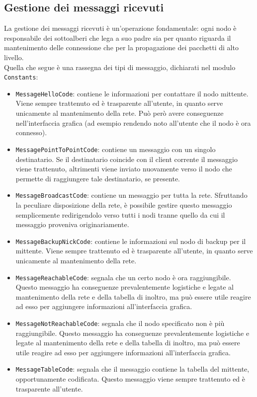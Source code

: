 \documentclass[10pt]{article} %
\begin{document}
\subsection{Gestione dei messaggi ricevuti}
La gestione dei messaggi ricevuti è un'operazione fondamentale: ogni nodo è responsabile dei sottoalberi che lega a suo padre sia per quanto riguarda il mantenimento delle connessione che per la propagazione dei pacchetti di alto livello. \\
Quella che segue è una rassegna dei tipi di messaggio, dichiarati nel modulo { \tt Constants}:
\begin{itemize}
	\item {\tt MessageHelloCode}: contiene le informazioni per contattare il nodo mittente. Viene sempre trattenuto ed è trasparente all'utente, in quanto serve unicamente al mantenimento della rete. Può però avere conseguenze nell'interfaccia grafica (ad esempio rendendo noto all'utente che il nodo è ora connesso).
	\item {\tt MessagePointToPointCode}: contiene un messaggio con un singolo destinatario. Se il destinatario coincide con il client corrente il messaggio viene trattenuto, altrimenti viene inviato nuovamente verso il nodo che permette di raggiungere tale destinatario, se presente.
	\item {\tt MessageBroadcastCode}: contiene un messaggio per tutta la rete. Sfruttando la peculiare disposizione della rete, è possibile gestire questo messaggio semplicemente redirigendolo verso tutti i nodi tranne quello da cui il messaggio proveniva originariamente.
	\item {\tt MessageBackupNickCode}: contiene le informazioni sul nodo di backup per il mittente. Viene sempre trattenuto ed è trasparente all'utente, in quanto serve unicamente al mantenimento della rete.
	\item {\tt MessageReachableCode}: segnala che un certo nodo è ora raggiungibile. Questo messaggio ha conseguenze prevalentemente logistiche e legate al mantenimento della rete e della tabella di inoltro, ma può essere utile reagire ad esso per aggiungere informazioni all'interfaccia grafica.
	\item {\tt MessageNotReachableCode}: segnala che il nodo specificato non è più raggiungibile. Questo messaggio ha conseguenze prevalentemente logistiche e legate al mantenimento della rete e della tabella di inoltro, ma può essere utile reagire ad esso per aggiungere informazioni all'interfaccia grafica.
	\item {\tt MessageTableCode}: segnala che il messaggio contiene la tabella del mittente, opportunamente codificata. Questo messaggio viene sempre trattenuto ed è trasparente all'utente.
\end{itemize}
\end{document}
